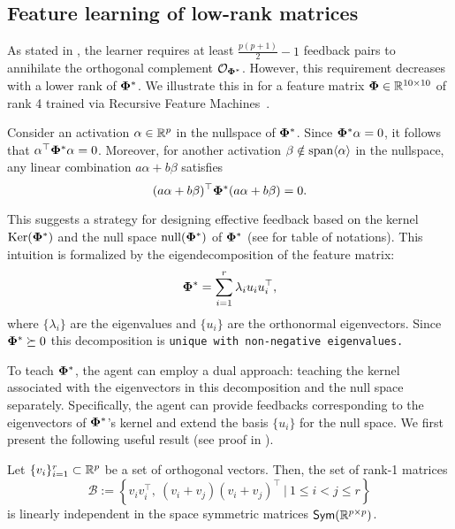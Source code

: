 \subsection{Feature learning of low-rank matrices}

As stated in , the learner requires at least $\frac{p(p+1)}{2} - 1$ feedback pairs to annihilate the orthogonal complement $\mathcal{O}_{\boldsymbol{\Phi}^*}$. However, this requirement decreases with a lower rank of $\boldsymbol{\Phi}^*$. We illustrate this in  for a feature matrix $\boldsymbol{\Phi} \in \mathbb{R}^{10 \times 10}$ of rank 4 trained via Recursive Feature Machines~\citep{rfm}.

Consider an activation $\alpha \in \mathbb{R}^p$ in the nullspace of $\boldsymbol{\Phi}^*$. Since $\boldsymbol{\Phi}^*\alpha = 0$, it follows that $\alpha^\top \boldsymbol{\Phi}^* \alpha = 0$. Moreover, for another activation $\beta \notin \text{span}\langle{\alpha}\rangle$ in the nullspace, any linear combination $a\alpha + b\beta$ satisfies
$$(a\alpha + b\beta)^\top \pphi^* (a\alpha + b\beta) = 0.\vspace{-4mm}$$

This suggests a strategy for designing effective feedback based on the kernel $\mathrm{Ker}({\boldsymbol{\Phi}^*})$ and the null space $\mathrm{null}({\boldsymbol{\Phi}^*})$ of $\boldsymbol{\Phi}^*$ (see  for table of notations). This intuition is formalized by the eigendecomposition of the feature matrix:\vspace{-3mm}
\begin{align}
    \pphi^* = \sum_{i=1}^r \lambda_i u_i u_i^\top, \label{eq: eigen} \vspace{-4mm}
\end{align}
where $\{\lambda_i\}$ are the eigenvalues and $\{u_i\}$ are the orthonormal eigenvectors.
Since $\boldsymbol{\Phi}^* \succeq 0$ this decomposition is \tt{unique} with non-negative eigenvalues.

To teach $\boldsymbol{\Phi}^*$, the agent can employ a dual approach: teaching the kernel associated with the eigenvectors in this decomposition and the null space separately. Specifically, the agent can provide feedbacks corresponding to the eigenvectors of $\boldsymbol{\Phi}^*$'s kernel and extend the basis $\{u_i\}$ for the null space. We first present the following useful result (see proof in ).

\begin{lemma}\label{lem: basis}
    Let $\{v_i\}_{i=1}^r \subset \mathbb{R}^p$ be a set of orthogonal vectors. Then, the set of rank-1 matrices
    \[
    \mathcal{B} := \left\{v_i v_i^{\top},\ (v_i + v_j)(v_i + v_j)^{\top}\ \bigg| \ 1 \leq i < j \leq r \right\}
    \]
    is linearly independent in the space symmetric matrices $\textsf{Sym}(\mathbb{R}^{p\times p})$.
\end{lemma}

